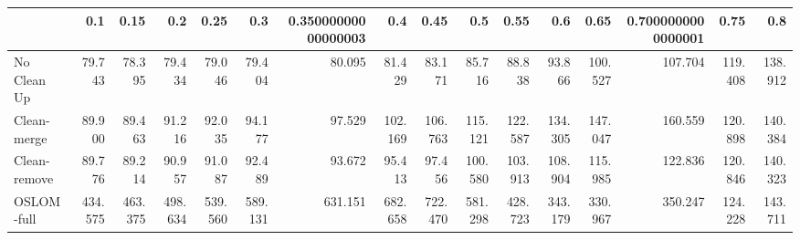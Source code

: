 \begin{tabular}{lrrrrrrrrrrrrrrr}
\toprule
{} &     0.1 &    0.15 &     0.2 &    0.25 &     0.3 & 0.35000000000000003 &     0.4 &    0.45 &     0.5 &    0.55 &     0.6 &    0.65 & 0.7000000000000001 &    0.75 &     0.8 \\
\midrule
No Clean Up  &  79.743 &  78.395 &  79.434 &  79.046 &  79.404 &              80.095 &  81.429 &  83.171 &  85.716 &  88.838 &  93.866 & 100.527 &            107.704 & 119.408 & 138.912 \\
Clean-merge  &  89.900 &  89.463 &  91.216 &  92.035 &  94.177 &              97.529 & 102.169 & 106.763 & 115.121 & 122.587 & 134.305 & 147.047 &            160.559 & 120.898 & 140.384 \\
Clean-remove &  89.776 &  89.214 &  90.957 &  91.087 &  92.489 &              93.672 &  95.413 &  97.456 & 100.580 & 103.913 & 108.904 & 115.985 &            122.836 & 120.846 & 140.323 \\
OSLOM-full   & 434.575 & 463.375 & 498.634 & 539.560 & 589.131 &             631.151 & 682.658 & 722.470 & 581.298 & 428.723 & 343.179 & 330.967 &            350.247 & 124.228 & 143.711 \\
\bottomrule
\end{tabular}
